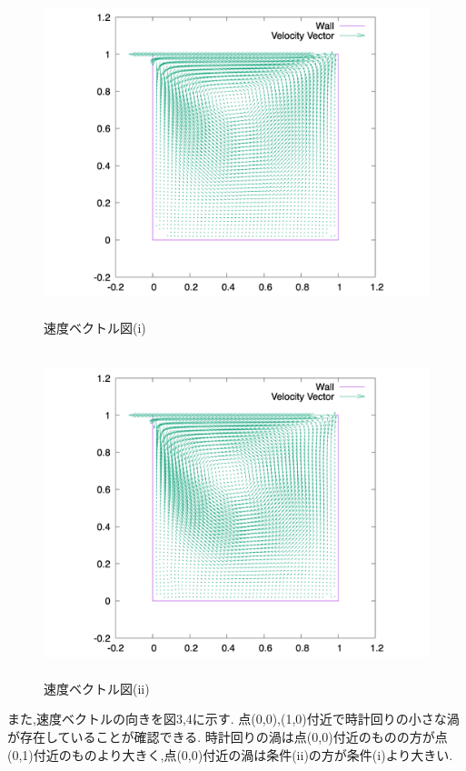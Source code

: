 \documentclass[upLaTeX,a4paper]{jsarticle}
\begin{document}
\begin{figure}[H]
  \centering
  \includegraphics[height=9.5cm]{outputs/img/velocity_vector_re50.png}
  \caption{速度ベクトル図(i)}
  \label{fig:velocity_vector_re50}
\end{figure}
\begin{figure}[H]
  \centering
  \includegraphics[height=9.5cm]{outputs/img/velocity_vector_re200.png}
  \caption{速度ベクトル図(ii)}
  \label{fig:velocity_vector_re200}
\end{figure}

また,速度ベクトルの向きを図3,4に示す.
点(0,0),(1,0)付近で時計回りの小さな渦が存在していることが確認できる.
時計回りの渦は点(0,0)付近のものの方が点(0,1)付近のものより大きく,点(0,0)付近の渦は条件(ii)の方が条件(i)より大きい.
\end{document}
